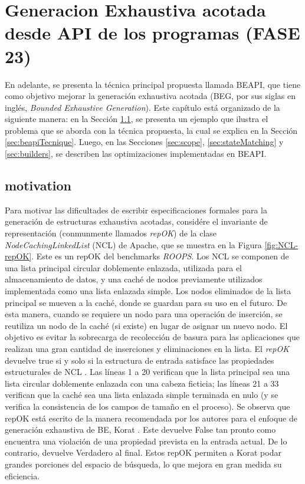 \chapter[Generacion Exhaustiva acotada desde API de los programas (FASE 23)]{Generacion Exhaustiva acotada desde API de los programas (FASE 23)}
\label{cap:beapi}

En adelante, se presenta la técnica principal propuesta llamada BEAPI, que tiene como objetivo mejorar la generación exhaustiva acotada (BEG, por sus siglas en inglés, \emph{Bounded Exhaustive Generation}). Este capítulo está organizado de la siguiente manera: en la Sección \ref{sec:motivation}, se presenta un ejemplo que ilustra el problema que se aborda con la técnica propuesta, la cual se explica en la Sección \ref{sec:beapiTecnique}. Luego, en las Secciones \ref{sec:scope}, \ref{sec:stateMatching} y \ref{sec:builders}, se describen las optimizaciones implementadas en BEAPI.


\section[Motivation]{motivation}
\label{sec:motivation}

Para motivar las dificultades de escribir especificaciones formales para la generación de estructuras exhaustiva acotadas,  considére el invariante de representación (conmunmente llamados \emph{repOK}) de la clase \emph{NodeCachingLinkedList} (NCL) de Apache, que se muestra en la Figura \ref{fig:NCL-repOK}. Este es un repOK del benchmarks \emph{ROOPS}. Los NCL se componen de una lista principal circular doblemente enlazada, utilizada para el almacenamiento de datos, y una caché de nodos previamente utilizados implementada como una lista enlazada simple. Los nodos eliminados de la lista principal se mueven a la caché, donde se guardan para su uso en el futuro. De esta manera, cuando se requiere un nodo para una operación de inserción, se reutiliza un nodo de la caché (si existe) en lugar de asignar un nuevo nodo. El objetivo es evitar la sobrecarga de recolección de basura para las aplicaciones que realizan una gran cantidad de inserciones y eliminaciones en la lista. El \emph{repOK} devuelve true si y solo si la estructura de entrada satisface las propiedades estructurales de NCL \cite{Liskov00}. Las líneas 1 a 20 verifican que la lista principal sea una lista circular doblemente enlazada con una cabeza ficticia; las líneas 21 a 33 verifican que la caché sea una lista enlazada simple terminada en nulo (y se verifica la consistencia de los campos de tamaño en el proceso). Se observa que repOK está escrito de la manera recomendada por los autores para el enfoque de generación exhaustiva de BE, \textsf{Korat} \cite{Boyapati02}. Este devuelve False tan pronto como encuentra una violación de una propiedad prevista en la entrada actual. De lo contrario, devuelve Verdadero al final. Estos repOK permiten a \textsf{Korat} podar grandes porciones del espacio de búsqueda, lo que mejora en gran medida su eficiencia.


